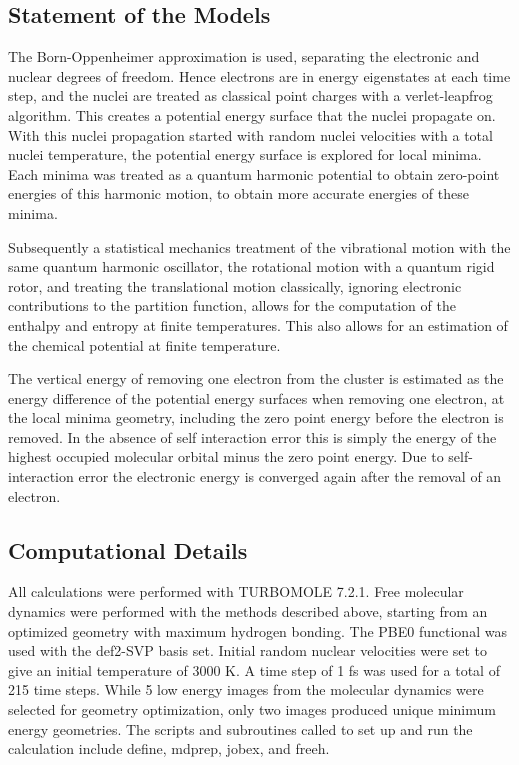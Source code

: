 \documentclass[11pt]{article}
\begin{document}
\subsection{Statement of the Models}

The Born-Oppenheimer approximation is used, separating the
electronic and nuclear degrees of freedom.  Hence electrons are in
energy eigenstates at each time step, and the nuclei are treated
as classical point charges with a verlet-leapfrog algorithm. 
This creates a potential energy surface that the nuclei propagate on.
With this nuclei propagation started with random nuclei velocities
with a total nuclei temperature, the potential energy surface is
explored for local minima. Each minima was treated as a quantum
harmonic potential to obtain zero-point energies of this
harmonic motion, to obtain more accurate energies of these minima.

Subsequently a statistical mechanics treatment of the
vibrational motion with the same quantum harmonic oscillator,
the rotational motion with a quantum rigid rotor, and treating
the translational motion classically, ignoring electronic
contributions to the partition function, allows for the
computation of the enthalpy and entropy at finite temperatures.
This also allows for an estimation of the chemical potential at
finite temperature.

The vertical energy of removing one electron from the cluster
is estimated as the energy difference of the potential energy
surfaces when removing one electron, at the local minima
geometry, including the zero point energy before the electron is
removed. In the absence of self interaction error this is simply
the energy of the highest occupied molecular orbital minus the
zero point energy. Due to self-interaction error the electronic
energy is converged again after the removal of an electron. 

\subsection{Computational Details}

All calculations were performed with TURBOMOLE 7.2.1.\cite{TURBOMOLE}
Free molecular dynamics were performed with the methods
described above, starting from an optimized geometry with
maximum hydrogen bonding. The PBE0 functional was used with
the def2-SVP basis set. Initial random nuclear velocities were
set to give an initial temperature of 3000 K. A time step of
1 fs was used for a total of 215 time steps. While 5 low
energy images from the molecular dynamics were selected for
geometry optimization, only two images produced unique
minimum energy geometries. The scripts and subroutines
called to set up and run the calculation include define,
mdprep, jobex, and freeh.
\end{document}

